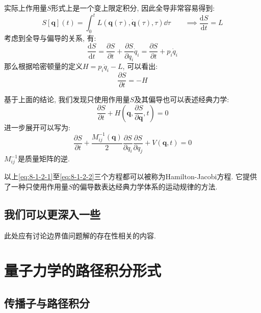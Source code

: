         实际上作用量$S$形式上是一个变上限定积分, 因此全导非常容易得到: 
        \begin{equation}
            S[\bm q](t) = \int_{0}^{t} L( \bm q(\tau), \bm \dot q(\tau), \tau ) \dd \tau
            \qquad \implies \frac{\mathrm{d} S}{\mathrm{d} t} = L
        \end{equation}
        考虑到全导与偏导的关系, 有:
        \begin{equation}
            \frac{\mathrm{d} S}{\mathrm{d} t} = \frac{\partial S}{\partial t} + \frac{\partial S}{\partial q_i} \dot{q}_i = \frac{\partial S}{\partial t} + p_i\dot{q}_i
        \end{equation}
        那么根据哈密顿量的定义$H = p_i \dot q_i - L$, 可以看出:
        \begin{equation}\label{eq:8-1-2-1}
            \frac{\partial S}{\partial t} = - H
        \end{equation}

        基于上面的结论, 我们发现只使用作用量$S$及其偏导也可以表述经典力学: 
        \begin{equation}
            \frac{\partial S}{\partial t} + H(\bm q, \frac{\partial S}{\partial \bm q}, t) = 0
        \end{equation}
        进一步展开可以写为:
        \begin{equation}\label{eq:8-1-2-2}
            \frac{\partial S}{\partial t} + \frac{M^{-1}_{ij}(\bm q)}{2} \frac{\partial S}{\partial q_i}\frac{\partial S}{\partial q_j} + V(\bm q, t) = 0
        \end{equation}
        $M^{-1}_{ij}$是质量矩阵的逆. 

        以上\ref{eq:8-1-2-1}至\ref{eq:8-1-2-2}三个方程都可以被称为Hamilton-Jacobi方程. 它提供了一种只使用作用量$S$的偏导数表达经典力学体系的运动规律的方法.

        \subsection{我们可以更深入一些}

        此处应有讨论边界值问题解的存在性相关的内容.

    \section{量子力学的路径积分形式}

        \subsection{传播子与路径积分}

